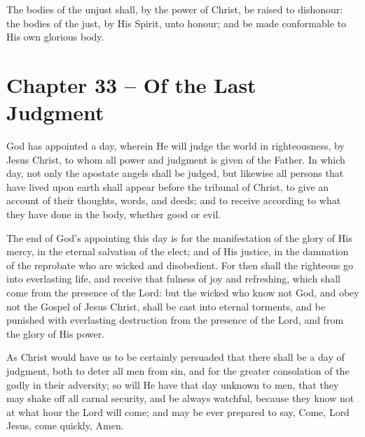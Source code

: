 \begin{outerlst}[left=0pt,labelsep=0pt]
\begin{innerlst}[resume*]
\item The bodies of the unjust shall, by the power of Christ, be raised to dishonour: the bodies of the just, by His Spirit, unto honour; and be made conformable to His own glorious body.  
\end{innerlst}

\item
{}
\section{Chapter 33 -- Of the Last Judgment}
\begin{innerlst}[resume*]

\item God has appointed a day, wherein He will judge the world in righteousness, by Jesus Christ, to whom all power and judgment is given of the Father. In which day, not only the apostate angels shall be judged, but likewise all persons that have lived upon earth shall appear before the tribunal of Christ, to give an account of their thoughts, words, and deeds; and to receive according to what they have done in the body, whether good or evil.   

\item The end of God's appointing this day is for the manifestation of the glory of His mercy, in the eternal salvation of the elect; and of His justice, in the damnation of the reprobate who are wicked and disobedient. For then shall the righteous go into everlasting life, and receive that fulness of joy and refreshing, which shall come from the presence of the Lord: but the wicked who know not God, and obey not the Gospel of Jesus Christ, shall be cast into eternal torments, and be punished with everlasting destruction from the presence of the Lord, and from the glory of His power.   

\item As Christ would have us to be certainly persuaded that there shall be a day of judgment, both to deter all men from sin, and for the greater consolation of the godly in their adversity; so will He have that day unknown to men, that they may shake off all carnal security, and be always watchful, because they know not at what hour the Lord will come; and may be ever prepared to say, Come, Lord Jesus, come quickly, Amen. 
\end{innerlst}
\end{outerlst}